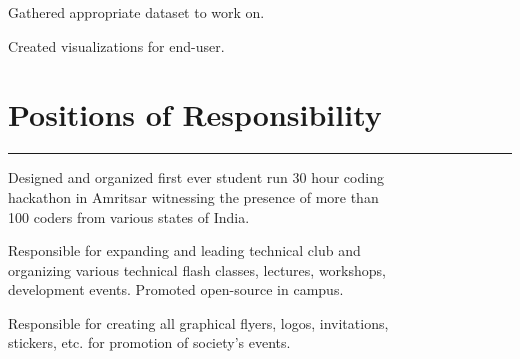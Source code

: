 \documentclass[]{puneet-resume}
\begin{document}
\begin{minipage}[t]{0.66\textwidth}
 
\noindent
\hspace{2.8em}%
\begin{minipage}{0.85\textwidth\vspace{2pt}}
\begin{tightemize}
	\item Gathered appropriate dataset to work on.
	\item Created visualizations for end-user.
\end{tightemize}
\end{minipage}
\sectionsep
\section{Positions of Responsibility} 
\noindent\rule{12.5cm}{0.4pt}
 
\noindent
\hspace{5em}%
\begin{minipage}{0.85\textwidth\vspace{2pt}}
Designed and organized first ever student run 30 hour coding\\
hackathon in Amritsar witnessing the presence of more than\\
100 coders from various states of India.
\end{minipage}
 
\noindent
\hspace{5em}%
\begin{minipage}{0.85\textwidth\vspace{2pt}}
Responsible for expanding and leading technical club and\\
organizing various technical flash classes, lectures, workshops,\\
development events. Promoted open-source in campus.
\end{minipage}
 
\noindent
\hspace{5em}%
\begin{minipage}{0.85\textwidth\vspace{2pt}}
Responsible for creating all graphical flyers, logos, invitations,\\
stickers, etc. for promotion of society's events.
\end{minipage}

\end{minipage}
\end{document}
